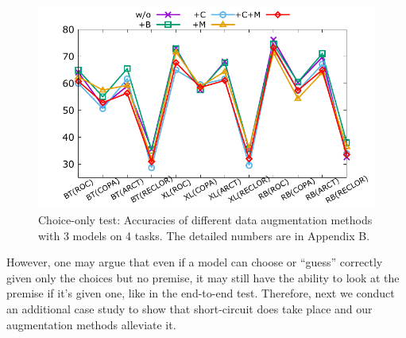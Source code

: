 %
\begin{figure}[th]
    \centering
    \includegraphics[width=1.0\columnwidth]{data/choice-only.pdf}
    \caption{Choice-only test: Accuracies of different data augmentation methods with 3 models on 4 tasks. 
    The detailed numbers are in Appendix B.}
    \label{fig:choice-only}
\end{figure}

However, one may argue that even if a model can 
choose or ``guess'' correctly given only the choices but no premise, 
it may still have the ability to look at the premise if it's given one,
like in the end-to-end test.
Therefore, next we conduct an additional case study to show that short-circuit
does take place and our augmentation methods alleviate it.

